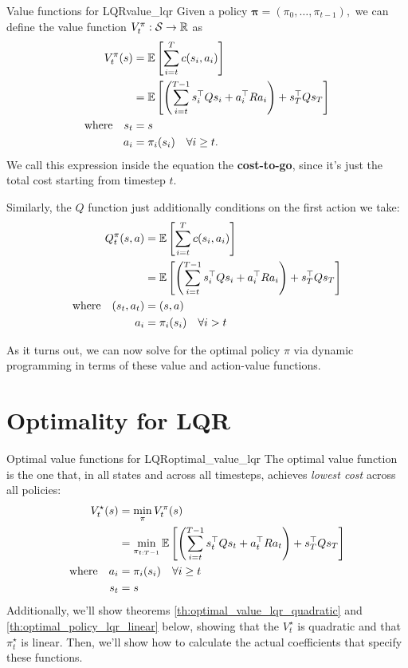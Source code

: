 \documentclass[../main/main]{subfiles}
\begin{document}
\begin{definition}{Value functions for LQR}{value_lqr}
    Given a policy $\mathbf{\pi} = (\pi_0, \dots, \pi_{t-1}),$ we can define the
    value function $V^\pi_t : \mathcal{S} \to \mathbb{R}$ as \[ \begin{split}
        V^\pi_t (s) &= \operatorname*{\mathbb{E}} \left[ \sum_{i=t}^{T} c(s_i, a_i) \right] \\
        &= \operatorname*{\mathbb{E}} \left[ \left( \sum_{i=t}^{T-1} s_i^\top Q s_i + a_i^\top R a_i \right) + s_T^\top Q s_T \right] \\
        \textrm{where} \quad s_t &= s \\
        a_i &= \pi_i(s_i) \quad \forall i \ge t.
    \end{split} \]
    We call this expression inside the equation the \textbf{cost-to-go},
    since it's just the total cost starting from timestep $t$.

    Similarly, the $Q$ function just additionally conditions on the first
    action we take: \[ \begin{split}
        Q^\pi_t (s, a) &= \operatorname*{\mathbb{E}} \left[ \sum_{i=t}^{T} c(s_i, a_i) \right] \\
        &= \operatorname*{\mathbb{E}} \left[ \left( \sum_{i=t}^{T-1} s_i^\top Q s_i + a_i^\top R a_i \right) + s_T^\top Q s_T \right] \\
        \textrm{where} \quad (s_t, a_t) &= (s, a) \\
        \quad a_i &= \pi_i(s_i) \quad \forall i > t
    \end{split} \]
\end{definition}

As it turns out, we can now solve for the optimal policy $\pi$ via dynamic
programming in terms of these value and action-value functions.

\section{Optimality for LQR}

\begin{definition}{Optimal value functions for LQR}{optimal_value_lqr}
    The optimal value function is the one that, in all states and across all timesteps,
    achieves \emph{lowest cost} across all policies: \[
        \begin{split}
            V^\star_t(s) &= \min_\pi V^\pi_t(s) \\
            &= \min_{\pi_{t:T-1}} \operatorname*{\mathbb{E}} \left[ \left( \sum_{i=t}^{T-1} s_t^\top Q s_t + a_t^\top R a_t \right) + s_T^\top Q s_T \right] \\
            \textrm{where} \quad a_i &= \pi_i(s_i) \quad \forall i \ge t \\
            s_t &= s
        \end{split}
    \]
    Additionally, we'll show theorems \ref{th:optimal_value_lqr_quadratic} and \ref{th:optimal_policy_lqr_linear} below,
    showing that the $V^\star_t$ is quadratic and that $\pi^\star_t$ is linear.
    Then, we'll show how to calculate the actual coefficients that specify these
    functions.
\end{definition}
\end{document}
